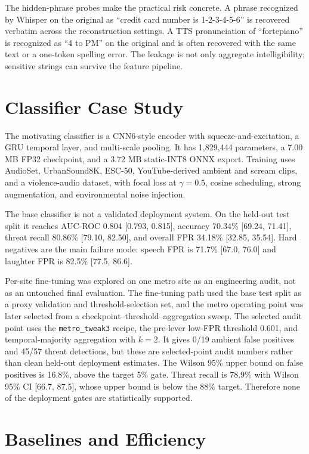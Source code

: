 \documentclass[twocolumn]{article}
\begin{document}
The hidden-phrase probes make the practical risk concrete. A phrase recognized
by Whisper on the original as ``credit card number is 1-2-3-4-5-6'' is
recovered verbatim across the reconstruction settings. A TTS pronunciation of
``fortepiano'' is recognized as ``4 to PM'' on the original and is often
recovered with the same text or a one-token spelling error. The leakage is not
only aggregate intelligibility; sensitive strings can survive the feature
pipeline.

\section{Classifier Case Study}

The motivating classifier is a CNN6-style encoder with squeeze-and-excitation,
a GRU temporal layer, and multi-scale pooling. It has 1,829,444 parameters, a
7.00 MB FP32 checkpoint, and a 3.72 MB static-INT8 ONNX export. Training uses
AudioSet, UrbanSound8K, ESC-50, YouTube-derived ambient and scream clips, and a
violence-audio dataset, with focal loss at \(\gamma=0.5\), cosine scheduling,
strong augmentation, and environmental noise injection.

The base classifier is not a validated deployment system. On the held-out test
split it reaches AUC-ROC 0.804 [0.793, 0.815], accuracy 70.34\%
[69.24, 71.41], threat recall 80.86\% [79.10, 82.50], and overall FPR
34.18\% [32.85, 35.54]. Hard negatives are the main failure mode: speech FPR
is 71.7\% [67.0, 76.0] and laughter FPR is 82.5\% [77.5, 86.6].

Per-site fine-tuning was explored on one metro site as an engineering audit,
not as an untouched final evaluation. The fine-tuning path used the base test
split as a proxy validation and threshold-selection set, and the metro
operating point was later selected from a checkpoint--threshold--aggregation
sweep. The selected audit point uses the \texttt{metro\_tweak3} recipe, the
pre-lever low-FPR threshold 0.601, and temporal-majority aggregation with
\(k=2\). It gives 0/19 ambient false positives and 45/57 threat detections,
but these are selected-point audit numbers rather than clean held-out
deployment estimates. The Wilson 95\% upper bound on false positives is
16.8\%, above the target 5\% gate. Threat recall is 78.9\% with Wilson 95\%
CI [66.7, 87.5], whose upper bound is below the 88\% target. Therefore
none of the deployment gates are statistically supported.

\section{Baselines and Efficiency}
\end{document}
